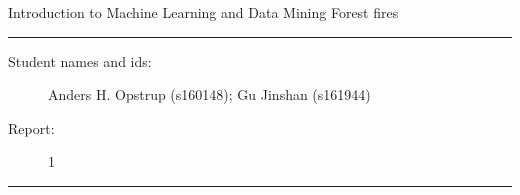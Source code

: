 \documentclass[11pt]{article}
\begin{document}
\begin{center}
{{\Large \sc Introduction to Machine Learning and Data Mining}} \newline	
{{\Large \sc Forest fires}}
\end{center}
\rule{\textwidth}{1pt}
\begin{description}
\item[Student names and ids:] Anders H. Opstrup (s160148); Gu Jinshan (s161944)
\item[Report:] 1
\end{description}
\rule{\textwidth}{1pt}











\end{document}
